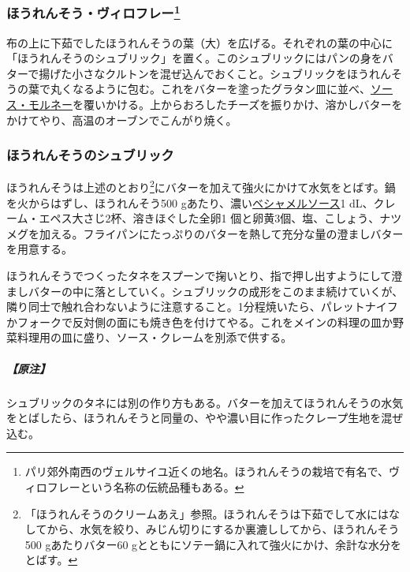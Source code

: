 \hypertarget{epinards-a-la-viroflay}{%
\subsubsection[ほうれんそう・ヴィロフレー]{\texorpdfstring{ほうれんそう・ヴィロフレー\footnote{パリ郊外南西のヴェルサイユ近くの地名。ほうれんそうの栽培で有名で、ヴィロフレーという名称の伝統品種もある。}}{ほうれんそう・ヴィロフレー}}\label{epinards-a-la-viroflay}}


布の上に下茹でしたほうれんそうの葉（大）を広げる。それぞれの葉の中心に「ほうれんそうのシュブリック」を置く。このシュブリックにはパンの身をバターで揚げた小さなクルトンを混ぜ込んでおくこと。シュブリックをほうれんそうの葉で丸くなるように包む。これをバターを塗ったグラタン皿に並べ、\protect\hyperlink{sauce-mornay}{ソース・モルネー}を覆いかける。上からおろしたチーズを振りかけ、溶かしバターをかけてやり、高温のオーブンでこんがり焼く。

\hypertarget{subric-d-epinards}{%
\subsubsection{ほうれんそうのシュブリック}\label{subric-d-epinards}}


ほうれんそうは上述のとおり\footnote{「ほうれんそうのクリームあえ」参照。ほうれんそうは下茹でして水にはなしてから、水気を絞り、みじん切りにするか裏漉ししてから、ほうれんそう500
  gあたりバター60
  gとともにソテー鍋に入れて強火にかけ、余計な水分をとばす。}にバターを加えて強火にかけて水気をとばす。鍋を火からはずし、ほうれんそう500
gあたり、濃い\protect\hyperlink{sauce-bechamel}{ベシャメルソース}1
dL、クレーム・エペス大さじ2杯、溶きほぐした全卵1
個と卵黄3個、塩、こしょう、ナツメグを加える。フライパンにたっぷりのバターを熱して充分な量の澄ましバターを用意する。

ほうれんそうでつくったタネをスプーンで掬いとり、指で押し出すようにして澄ましバターの中に落としていく。シュブリックの成形をこのまま続けていくが、隣り同士で触れ合わないように注意すること。1分程焼いたら、パレットナイフかフォークで反対側の面にも焼き色を付けてやる。これをメインの料理の皿か野菜料理用の皿に盛り、ソース・クレームを別添で供する。

\hypertarget{nota-subric-d-epinards}{%
\subparagraph{【原注】}\label{nota-subric-d-epinards}}

シュブリックのタネには別の作り方もある。バターを加えてほうれんそうの水気をとばしたら、ほうれんそうと同量の、やや濃い目に作ったクレープ生地を混ぜ込む。

